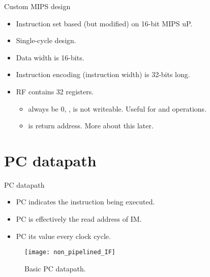 % 
\begin{frame}{Custom MIPS design}
\begin{itemize}
\item Instruction set based (but modified) on 16-bit \ac{MIPS} \ac{uP}.
\item Single-cycle design.
\item Data width is 16-bits.
\item Instruction encoding (instruction width) is 32-bits long.
\item \ac{RF} contains 32 registers.
\begin{itemize}
\item {}  always be 0, \ie,  is not writeable. Useful for  and  operations.
\item {} is return address. More about this later.
\end{itemize}
\end{itemize}
\end{frame}

\section{PC datapath}
% 
\begin{frame}{\ac{PC} datapath}
\begin{itemize}
\item \ac{PC} indicates the instruction being executed.
\item \ac{PC} is effectively the read address of \ac{IM}.
\item \ac{PC}  its value every clock cycle.
\end{itemize}
  \begin{figure}
  \centering
  \texttt{[image: non\_pipelined\_IF]}
  \caption{Basic \ac{PC} datapath.}
  \label{Figure:non_pipelined_IF}
  \end{figure}
  
\end{frame}

